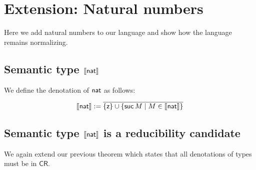 \documentclass{article}
\newcommand{\CR}{\mathsf{CR}}
\newcommand{\clos}[1]{\overline{#1}}
\def\lv{\mathopen{{[\kern-0.14em[}}}    %
\def\rv{\mathclose{{]\kern-0.14em]}}}   %
\newcommand{\den}[1]{\lv #1 \rv}
\begin{document}
 \section{Extension: Natural numbers}
Here we add natural numbers to our language and show how the language remains normalizing.
\subsection{Semantic type $\den{\nat}$} We define the denotation of $\mathsf{nat}$ as
 follows:

 \[
 \den{\nat} := \clos{\{\zero\}\cup \{\suc M \mid M \in \den{\nat}\} }
 \]


\subsection{Semantic type $\den{\nat}$ is a reducibility candidate}
We again extend our previous theorem which states that all denotations of types must be in $\CR$.
\end{document}
